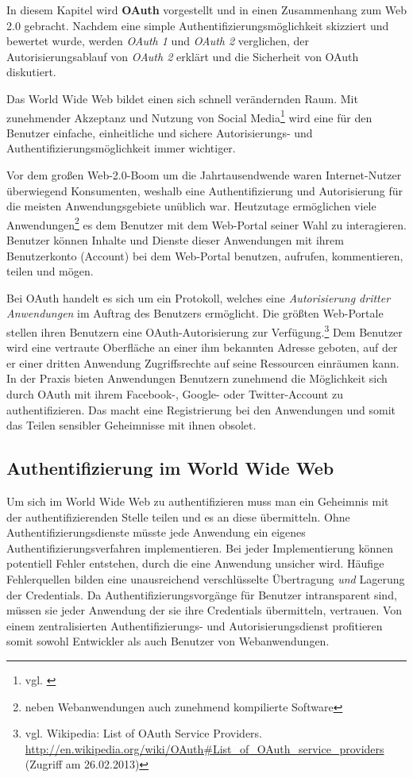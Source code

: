 \documentclass[12pt,a4paper,pointednumbers,abstracton]{scrartcl}
\begin{document}
In diesem Kapitel wird \textbf{OAuth} vorgestellt und in einen Zusammenhang zum Web 2.0 gebracht.
Nachdem eine simple Authentifizierungsmöglichkeit skizziert und bewertet wurde, werden \emph{OAuth 1} und \emph{OAuth 2} verglichen, der Autorisierungsablauf von \emph{OAuth 2} erklärt und die Sicherheit von OAuth diskutiert.

Das World Wide Web bildet einen sich schnell verändernden Raum.
Mit zunehmender Akzeptanz und Nutzung von Social Media\footnote{vgl. \cite[Section 1]{KH10}} wird eine für den Benutzer einfache, einheitliche und sichere Autorisierungs- und Authentifizierungsmöglichkeit immer wichtiger.

Vor dem großen Web-2.0-Boom um die Jahrtausendwende waren Internet-Nutzer überwiegend Konsumenten, weshalb eine Authentifizierung und Autorisierung für die meisten Anwendungsgebiete unüblich war.
Heutzutage ermöglichen viele Anwendungen\footnote{neben Webanwendungen auch zunehmend kompilierte Software} es dem Benutzer mit dem Web-Portal seiner Wahl zu interagieren.
Benutzer können Inhalte und Dienste dieser Anwendungen mit ihrem Benutzerkonto (Account) bei dem Web-Portal benutzen, aufrufen, kommentieren, teilen und mögen.

Bei OAuth handelt es sich um ein Protokoll, welches eine \emph{Autorisierung dritter Anwendungen} im Auftrag des Benutzers ermöglicht.
Die größten Web-Portale stellen ihren Benutzern eine OAuth-Autorisierung zur Verfügung.\footnote{vgl. Wikipedia: List of OAuth Service Providers. \url{http://en.wikipedia.org/wiki/OAuth\#List_of_OAuth_service_providers} (Zugriff am 26.02.2013)}
Dem Benutzer wird eine vertraute Oberfläche an einer ihm bekannten Adresse geboten, auf der er einer dritten Anwendung Zugriffsrechte auf seine Ressourcen einräumen kann.
In der Praxis bieten Anwendungen Benutzern zunehmend die Möglichkeit sich durch OAuth mit ihrem Facebook-, Google- oder Twitter-Account zu authentifizieren.
Das macht eine Registrierung bei den Anwendungen und somit das Teilen sensibler Geheimnisse mit ihnen obsolet.

\subsection{Authentifizierung im World Wide Web}

Um sich im World Wide Web zu authentifizieren muss man ein Geheimnis mit der authentifizierenden Stelle teilen und es an diese übermitteln.
Ohne Authentifizierungsdienste müsste jede Anwendung ein eigenes Authentifizierungsverfahren implementieren.
Bei jeder Implementierung können potentiell Fehler entstehen, durch die eine Anwendung unsicher wird.
Häufige Fehlerquellen bilden eine unausreichend verschlüsselte Übertragung \emph{und} Lagerung der Credentials.
Da Authentifizierungsvorgänge für Benutzer intransparent sind, müssen sie jeder Anwendung der sie ihre Credentials übermitteln, vertrauen.
Von einem zentralisierten Authentifizierungs- und Autorisierungsdienst profitieren somit sowohl Entwickler als auch Benutzer von Webanwendungen.
\end{document}

